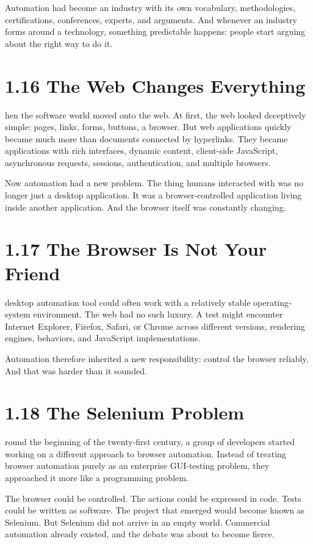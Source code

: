 \documentclass[11pt, a4paper, openany]{book}
\newcommand{\initialcap}[1]{{\fontfamily{lmss}\selectfont\huge\textbf{#1}}}
\begin{document}
Automation had become an industry with its own vocabulary, methodologies, certifications, conferences, experts, and arguments. And whenever an industry forms around a technology, something predictable happens: people start arguing about the right way to do it.

\section{1.16 The Web Changes Everything}
\noindent \initialcap{T}hen the software world moved onto the web. At first, the web looked deceptively simple: pages, links, forms, buttons, a browser. But web applications quickly became much more than documents connected by hyperlinks. They became applications with rich interfaces, dynamic content, client-side JavaScript, asynchronous requests, sessions, authentication, and multiple browsers.

Now automation had a new problem. The thing humans interacted with was no longer just a desktop application. It was a browser-controlled application living inside another application. And the browser itself was constantly changing.

\section{1.17 The Browser Is Not Your Friend}
\noindent \initialcap{A} desktop automation tool could often work with a relatively stable operating-system environment. The web had no such luxury. A test might encounter Internet Explorer, Firefox, Safari, or Chrome across different versions, rendering engines, behaviors, and JavaScript implementations.

Automation therefore inherited a new responsibility: control the browser reliably. And that was harder than it sounded.

\section{1.18 The Selenium Problem}
\noindent \initialcap{A}round the beginning of the twenty-first century, a group of developers started working on a different approach to browser automation. Instead of treating browser automation purely as an enterprise GUI-testing problem, they approached it more like a programming problem.

The browser could be controlled. The actions could be expressed in code. Tests could be written as software. The project that emerged would become known as Selenium. But Selenium did not arrive in an empty world. Commercial automation already existed, and the debate was about to become fierce.
\end{document}
